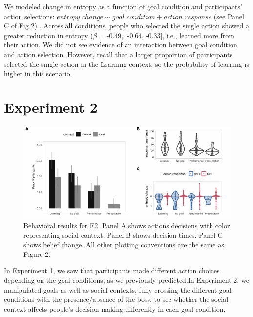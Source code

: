 \documentclass[10pt, letterpaper]{article}
\newenvironment{CodeChunk}{}{}
\begin{document}
We modeled change in entropy as a function of goal condition and
participants' action selections:
\texttt{$entropy\_change \sim goal\_condition + action\_response$} (see
Panel C of Fig 2) . Across all conditions, people who selected the
single action showed a greater reduction in entropy (\(\beta\) = -0.49,
{[}-0.64, -0.33{]}, i.e., learned more from their action. We did not see
evidence of an interaction between goal condition and action selection.
However, recall that a larger proportion of participants selected the
single action in the Learning context, so the probability of learning is
higher in this scenario.

\section{Experiment 2}\label{experiment-2}

\begin{CodeChunk}
\begin{figure}[tb]

{\centering \includegraphics[width=0.95\linewidth]{figs/e2_behav_results-1} 

}

\caption[Behavioral results for E2]{Behavioral results for E2. Panel A shows actions decisions with color representing social context. Panel B shows decision times. Panel C shows belief change. All other plotting conventions are the same as Figure 2.}\label{fig:e2_behav_results}
\end{figure}
\end{CodeChunk}

In Experiment 1, we saw that participants made different action choices
depending on the goal conditions, as we previously predicted.In
Experiment 2, we manipulated goals as well as social contexts, fully
crossing the different goal conditions with the presence/absence of the
boss, to see whether the social context affects people's decision making
differently in each goal condition.
\end{document}
